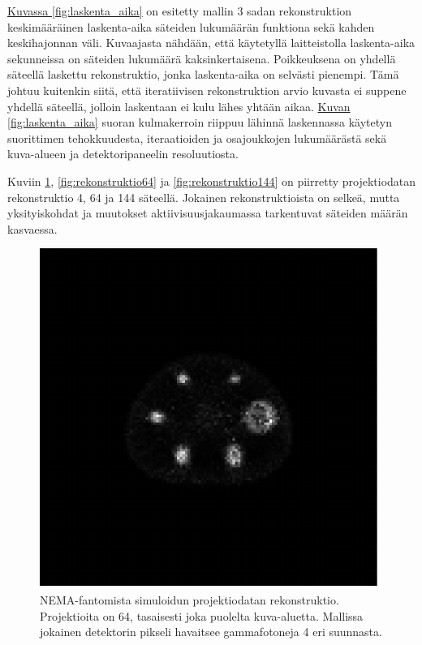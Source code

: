 \hyperref[fig:laskenta_aika]{Kuvassa \ref*{fig:laskenta_aika}} on esitetty mallin 3 sadan rekonstruktion keskimääräinen laskenta-aika säteiden lukumäärän funktiona sekä kahden keskihajonnan väli. Kuvaajasta nähdään, että käytetyllä laitteistolla laskenta-aika sekunneissa on säteiden lukumäärä kaksinkertaisena. Poikkeuksena on yhdellä säteellä laskettu rekonstruktio, jonka laskenta-aika on selvästi pienempi. Tämä johtuu kuitenkin siitä, että iteratiivisen rekonstruktion arvio kuvasta ei suppene yhdellä säteellä, jolloin laskentaan ei kulu lähes yhtään aikaa. \hyperref[fig:laskenta_aika]{Kuvan \ref*{fig:laskenta_aika}} suoran kulmakerroin riippuu lähinnä laskennassa käytetyn suorittimen tehokkuudesta, iteraatioiden ja osajoukkojen lukumäärästä sekä kuva-alueen ja detektoripaneelin resoluutiosta.

Kuviin \ref{fig:rekonstruktio4}, \ref{fig:rekonstruktio64} ja \ref{fig:rekonstruktio144} on piirretty projektiodatan rekonstruktio 4, 64 ja 144 säteellä. Jokainen rekonstruktioista on selkeä, mutta yksityiskohdat ja muutokset aktiivisuusjakaumassa tarkentuvat säteiden määrän kasvaessa.
\begin{figure}[H]
    \centering
    \captionsetup{width=.9\linewidth}
    \includegraphics[width=.9\linewidth]{kuvat/rekonstruktio_nRay4.pdf}
    \caption{NEMA-fantomista simuloidun projektiodatan rekonstruktio. Projektioita on 64, tasaisesti joka puolelta kuva-aluetta. Mallissa jokainen detektorin pikseli havaitsee gammafotoneja 4 eri suunnasta.}
    \label{fig:rekonstruktio4}
\end{figure}
